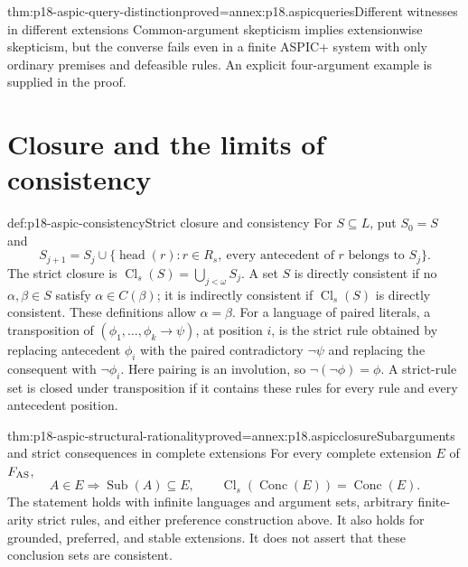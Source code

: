 \begin{hbtheorem}{thm:p18-aspic-query-distinction}{proved=annex:p18.aspicqueries}{Different witnesses in different extensions}
Common-argument skepticism implies extensionwise skepticism, but the
converse fails even in a finite ASPIC+ system with only ordinary premises
and defeasible rules. An explicit four-argument example is supplied in
the proof.
\end{hbtheorem}

\section{Closure and the limits of consistency}

\begin{hbdefinition}{def:p18-aspic-consistency}{Strict closure and consistency}
For \(S\subseteq L\), put \(S_0=S\) and
\[
 S_{j+1}=S_j\cup
 \{\operatorname{head}(r):r\in R_s,\
       \text{every antecedent of }r\text{ belongs to }S_j\}.
\]
The strict closure is \(\operatorname{Cl}_s(S)=\bigcup_{j<\omega}S_j\).
A set \(S\) is directly consistent if no
\(\alpha,\beta\in S\) satisfy \(\alpha\in C(\beta)\);
it is indirectly consistent if \(\operatorname{Cl}_s(S)\) is directly
consistent. These definitions allow \(\alpha=\beta\).
For a language of paired literals, a transposition of
\((\phi_1,\ldots,\phi_k\to\psi)\), at position \(i\), is the strict
rule obtained by replacing antecedent \(\phi_i\) with the paired
contradictory \(\neg\psi\) and replacing the consequent with
\(\neg\phi_i\). Here pairing is an involution, so
\(\neg(\neg\phi)=\phi\). A strict-rule set is closed under
transposition if it contains these rules for every rule and every
antecedent position.
\end{hbdefinition}

\begin{hbtheorem}{thm:p18-aspic-structural-rationality}{proved=annex:p18.aspicclosure}{Subarguments and strict consequences in complete extensions}
For every complete extension \(E\) of \(F_{\rm AS}\),
\[
 A\in E\Longrightarrow\operatorname{Sub}(A)\subseteq E,
 \qquad
 \operatorname{Cl}_s(\operatorname{Conc}(E))
       =\operatorname{Conc}(E).
\]
The statement holds with infinite languages and argument sets, arbitrary
finite-arity strict rules, and either preference construction above.
It also holds for grounded, preferred, and stable extensions.
It does not assert that these conclusion sets are consistent.
\end{hbtheorem}

